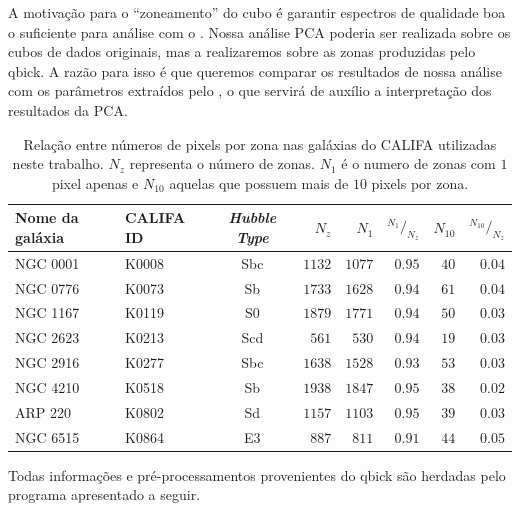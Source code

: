 A motivação para o ``zoneamento'' do cubo é garantir espectros de qualidade boa o suficiente para análise com o
\starlight. Nossa análise PCA poderia ser realizada sobre os cubos de dados originais, mas a realizaremos sobre as zonas
produzidas pelo {\sc qbick}. A razão para isso é que queremos comparar os resultados de nossa análise com os parâmetros
extraídos pelo \starlight, o que servirá de auxílio a interpretação dos resultados da PCA.

\begin{table}
	\caption[Relação de pixels e zonas em algumas galáxias do CALIFA.]
	{Relação entre números de pixels por zona nas galáxias do CALIFA utilizadas neste trabalho. $N_z$ representa o número
	de zonas. $N_1$ é o numero de zonas com $1$ pixel apenas e $N_{10}$ aquelas que possuem mais de $10$ pixels por zona.}
	\begin{tabular}{l l c r r r r r}
		Nome da galáxia & CALIFA ID & {\em Hubble Type} & $N_z$ & $N_{1}$ &
		${}^{N_1}/_{N_z}$ & $N_{10}$ & ${}^{N_{10}}/_{N_z}$
		\\
		\midrule
		NGC 0001 & K0008 & Sbc & $1132$ & $1077$ & $0.95$ & $40$ & $0.04$ \\
		NGC 0776 & K0073 & Sb  & $1733$ & $1628$ & $0.94$ & $61$ & $0.04$ \\
		NGC 1167 & K0119 & S0  & $1879$ & $1771$ & $0.94$ & $50$ & $0.03$ \\
		NGC 2623 & K0213 & Scd & $561$  & $530$  & $0.94$ & $19$ & $0.03$ \\
		NGC 2916 & K0277 & Sbc & $1638$ & $1528$ & $0.93$ & $53$ & $0.03$ \\
		NGC 4210 & K0518 & Sb  & $1938$ & $1847$ & $0.95$ & $38$ & $0.02$ \\
		ARP 220  & K0802 & Sd  & $1157$ & $1103$ & $0.95$ & $39$ & $0.03$ \\
		NGC 6515 & K0864 & E3  & $887$  & $811$  & $0.91$ & $44$ & $0.05$ \\
	\end{tabular}
	\label{tab:pixelZones}
\end{table}

Todas informações e pré-processamentos provenientes do {\sc qbick} são herdadas pelo programa apresentado a seguir.

\subsection{\pycasso}

